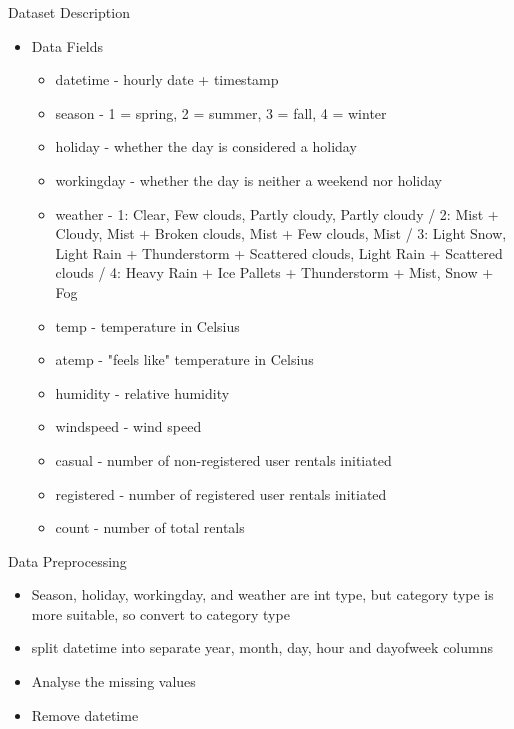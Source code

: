 \documentclass[
 size=14pt,
 paper=smartboard,  %
 mode=present, 		%
 display=slides, 	%
 style=tuliplab,  	%
 pauseslide,
 fleqn,leqno]{powerdot}
\begin{document}
\begin{slide}[toc=,bm=]{Dataset Description}
  \begin{itemize}
     \item Data Fields
    \begin{itemize} 
      \item datetime - hourly date + timestamp
      \item season - 1 = spring, 2 = summer, 3 = fall, 4 = winter
      \item holiday - whether the day is considered a holiday
      \item workingday - whether the day is neither a weekend nor holiday
      \item weather - 1: Clear, Few clouds, Partly cloudy, Partly cloudy / 2: Mist + Cloudy, Mist + Broken clouds, Mist + Few clouds, Mist / 3: Light Snow, Light Rain + Thunderstorm + Scattered clouds, Light Rain + Scattered clouds / 4: Heavy Rain + Ice Pallets + Thunderstorm + Mist, Snow + Fog
      \item temp - temperature in Celsius
      \item atemp - "feels like" temperature in Celsius
      \item humidity - relative humidity
      \item windspeed - wind speed
      \item casual - number of non-registered user rentals initiated
      \item registered - number of registered user rentals initiated
      \item count - number of total rentals
    \end{itemize} 
    \end{itemize}


\end{slide}

\begin{slide}[toc=,bm=]{Data Preprocessing}

\begin{itemize}
\item Season, holiday, workingday, and weather are int type, but category type is more suitable, so convert to category type
\item split datetime into separate year, month, day, hour and dayofweek columns
\item Analyse the missing values
\item Remove datetime 

\end{itemize}
\end{slide}
\end{document}
